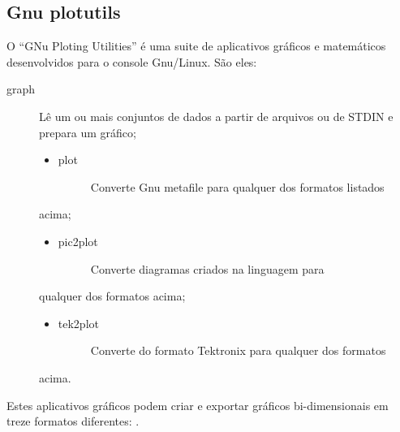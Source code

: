 \documentclass[a4paper,10pt,brazil]{sphinxmanual}
\begin{document}
\subsection{Gnu plotutils}
\label{bash:gnu-plotutils}
O ``GNu Ploting Utilities'' é uma suite de aplicativos gráficos e
matemáticos desenvolvidos para o console Gnu/Linux. São eles:
\begin{description}
\item[{graph}] \leavevmode
Lê um ou mais conjuntos de dados a partir de arquivos ou de STDIN e
prepara um gráfico;
\begin{itemize}
\item {} \begin{description}
\item[{plot}] \leavevmode
Converte Gnu metafile para qualquer dos formatos listados

\end{description}

\end{itemize}

acima;
\begin{itemize}
\item {} \begin{description}
\item[{pic2plot}] \leavevmode
Converte diagramas criados na linguagem  para

\end{description}

\end{itemize}

qualquer dos formatos acima;
\begin{itemize}
\item {} \begin{description}
\item[{tek2plot}] \leavevmode
Converte do formato Tektronix para qualquer dos formatos

\end{description}

\end{itemize}

acima.

\end{description}

Estes aplicativos gráficos podem criar e exportar gráficos
bi-dimensionais em treze formatos diferentes:
.
\end{document}
